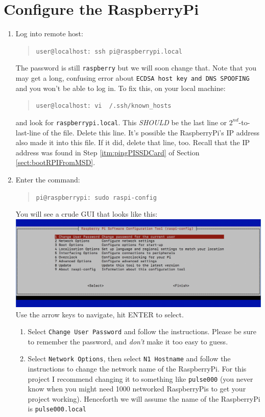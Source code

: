 \documentclass[11pt,oneside]{article}
\makeatletter
\newcommand{\localCommand}[1]{\begin{quote} \texttt{user@localhost: #1} \end{quote}}
\newcommand{\remoteCommandBeforeRename}[1]{\begin{quote} \texttt{pi@raspberrypi: #1} \end{quote}}
\makeatother
\begin{document}
\section{Configure the RaspberryPi} \label{sect:configureRaspberryPi}
\begin{enumerate}
	\item Log into remote host: \localCommand{ssh pi@raspberrypi.local}
	The password is still \texttt{raspberry} but we will soon change that.  Note that you may get a long, confusing error about \texttt{ECDSA host key and DNS SPOOFING} and you won't be able to log in.
	To fix this, on your local machine: \localCommand{vi ~/.ssh/known\_hosts} and look for \texttt{raspberrypi.local}.  This {\em SHOULD} be the last line or $2^{nd}$-to-last-line of the file.
	Delete this line.  It's possible the RaspberryPi's IP address also made it into this file.  If it did, delete that line, too.  Recall that the IP address was found in Step \ref{itm:pingPISSDCard}
	of Section \ref{sect:bootRPIFromMSD}.
	\item Enter the command: \remoteCommandBeforeRename{sudo raspi-config}
	You will see a crude GUI that looks like this:\\
	\includegraphics[scale=0.6]{raspiconfig.png}\\
	Use the arrow keys to navigate, hit ENTER to select.
	\begin{enumerate}
		\item Select \texttt{Change User Password} and follow the instructions.  Please be sure to remember the password, and {\em don't} make it too easy to guess. \label{itm:changePWD}
		\item Select \texttt{Network Options}, then select \texttt{N1 Hostname} and follow the instructions to change the network name of the RaspberryPi.  For this project I recommend
		changing it to something like \texttt{pulse000} (you never know when you might need 1000 networked RaspberryPis to get your project working).  Henceforth we will assume the
		name of the RaspberryPi is \texttt{pulse000.local}
	\end{enumerate}

\end{enumerate}
\end{document}
